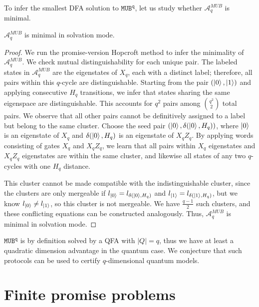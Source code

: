 \documentclass[../main.tex]{subfiles}
\begin{document}
To infer the smallest \ac{DFA} solution to $\mathtt{MUB^q}$, let us study whether $\mathcal{A}^{MUB}_{q}$ is minimal.

\begin{theorem}
    $\mathcal{A}^{MUB}_{q}$ is minimal in solvation mode.
\end{theorem}

\begin{proof}
    We run the promise-version Hopcroft method to infer the minimality of $\mathcal{A}^{MUB}_{q}$. We check mutual distinguishability for each unique pair. The labeled states in $\mathcal{A}^{MUB}_{q}$ are the eigenstates of $X_q$, each with a distinct label; therefore, all pairs within this $q$-cycle are distinguishable. Starting from the pair $(\ket{0},\ket{1})$ and applying consecutive $H_q$ transitions, we infer that states sharing the same eigenspace are distinguishable. This accounts for $q^2$ pairs among $\binom{q^2}{2}$ total pairs.
    We observe that all other pairs cannot be definitively assigned to a label but belong to the same cluster. Choose the seed pair $(\ket{0}, \delta(\ket{0},H_q))$, where $\ket{0}$ is an eigenstate of $X_q$ and $\delta(\ket{0},H_q)$ is an eigenstate of $X_q Z_q$. By applying words consisting of gates $X_q$ and $X_q Z_q$, we learn that all pairs within $X_q$ eigenstates and $X_q Z_q$ eigenstates are within the same cluster, and likewise all states of any two $q$-cycles with one $H_q$ distance. 
    
    This cluster cannot be made compatible with the indistinguishable cluster, since the clusters are only mergeable if $l_{\ket{0}}= l_{\delta(\ket{0},H_q)}$ and $l_{\ket{1}}= l_{\delta(\ket{1},H_q)}$, but we know $l_{\ket{0}} \neq l_{\ket{1}}$, so this cluster is not mergeable. We have $\frac{q-1}{2}$ such clusters, and these conflicting equations can be constructed analogously. Thus, $\mathcal{A}^{MUB}_{q}$ is minimal in solvation mode.
\end{proof}
$\mathtt{MUB^q}$ is by definition solved by a \ac{QFA} with $|Q| = q$, thus we have at least a quadratic dimension advantage in the quantum case. We conjecture that such protocols can be used to certify $q$-dimensional quantum models.

\section{Finite promise problems}
\end{document}
